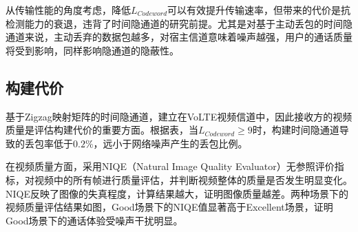 从传输性能的角度考虑，降低$L_{Codeword}$可以有效提升传输速率，但带来的代价是抗检测能力的衰退，违背了时间隐通道的研究前提。尤其是对基于主动丢包的时间隐通道来说，主动丢弃的数据包越多，对宿主信道意味着噪声越强，用户的通话质量将受到影响，同样影响隐通道的隐蔽性。

\subsection{构建代价}
\label{chap:zigzag:results:cost}


基于Zigzag映射矩阵的时间隐通道，建立在VoLTE视频信道中，因此接收方的视频质量是评估构建代价的重要方面。根据表，当$L_{Codeword}\ge 9$时，构建时间隐通道导致的丢包率低于$0.2\%$，远小于网络噪声产生的丢包比例。

在视频质量方面，采用NIQE（Natural Image Quality Evaluator）无参照评价指标，对视频中的所有帧进行质量评估，并判断视频整体的质量是否发生明显变化。NIQE反映了图像的失真程度，计算结果越大，证明图像质量越差。两种场景下的视频质量评估结果如图，Good场景下的NIQE值显著高于Excellent场景，证明Good场景下的通话体验受噪声干扰明显。


